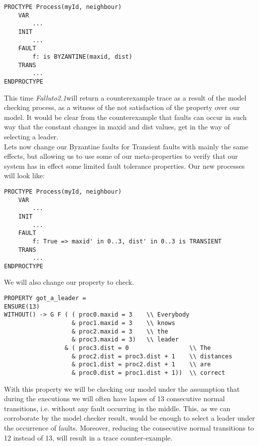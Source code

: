 \documentclass[12pt]{article}
\newcommand{\falluto}{\mbox{\textit{Falluto2.1}}}
\begin{document}
\begin{verbatim}
PROCTYPE Process(myId, neighbour)
    VAR
        ...
    INIT
        ...
    FAULT
        f: is BYZANTINE(maxid, dist)
    TRANS
        ...
ENDPROCTYPE
\end{verbatim}
This time \falluto will return a counterexample trace as a result of the model checking process, as a witness of the not satisfaction of the property over our model. It would be clear from the counterexample that faults can occur in such way that the constant changes in maxid and dist values, get in the way of selecting a leader.\\
Lets now change our Byzantine faults for Transient faults with mainly the same effects, but allowing us to use some of our meta-properties to verify that our system has in effect some limited fault tolerance properties. Our new processes will look like:
 \begin{verbatim}
PROCTYPE Process(myId, neighbour)
    VAR
        ...
    INIT
        ...
    FAULT
        f: True => maxid' in 0..3, dist' in 0..3 is TRANSIENT
    TRANS
        ...
ENDPROCTYPE
\end{verbatim}
We will also change our property to check.
\begin{verbatim}
PROPERTY got_a_leader =
ENSURE(13)
WITHOUT() -> G F ( ( proc0.maxid = 3    \\ Everybody
                   & proc1.maxid = 3    \\ knows
                   & proc2.maxid = 3    \\ the
                   & proc3.maxid = 3)   \\ leader
                 & ( proc3.dist = 0                 \\ The
                   & proc2.dist = proc3.dist + 1    \\ distances
                   & proc1.dist = proc2.dist + 1    \\ are
                   & proc0.dist = proc1.dist + 1))  \\ correct
\end{verbatim}
With this property we will be checking our model under the assumption that during the executions we will often have lapses of 13 consecutive normal transitions, i.e. without any fault occurring in the middle. This, as we can corroborate by the model checker result, would be enough to select a leader under the occurrence of faults. Moreover, reducing the consecutive normal transitions to 12 instead of 13, will result in a trace counter-example.
\end{document}
